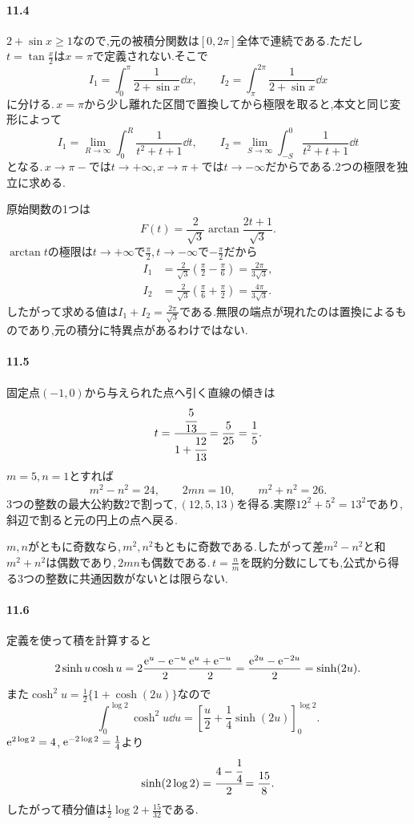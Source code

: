 \paragraph{11.4}
$2+\sin x\ge1$なので,元の被積分関数は$[0,2\pi]$全体で連続である.ただし$t=\tan\frac x2$は$x=\pi$で定義されない.そこで
\[
I_1=\int_0^\pi\frac1{2+\sin x}\dd x,\qquad
I_2=\int_\pi^{2\pi}\frac1{2+\sin x}\dd x
\]
に分ける.\,$x=\pi$から少し離れた区間で置換してから極限を取ると,本文と同じ変形によって
\[
I_1=\lim_{R\to\infty}\int_0^R\frac1{t^2+t+1}\dd t,\qquad
I_2=\lim_{S\to\infty}\int_{-S}^0\frac1{t^2+t+1}\dd t
\]
となる.\,$x\to\pi-$では$t\to+\infty$,\,$x\to\pi+$では$t\to-\infty$だからである.2つの極限を独立に求める.

原始関数の1つは
\[
F(t)=\frac2{\sqrt3}\arctan\frac{2t+1}{\sqrt3}.
\]
$\arctan t$の極限は$t\to+\infty$で$\frac\pi2$,\,$t\to-\infty$で$-\frac\pi2$だから
\[
\begin{aligned}
I_1&=\frac2{\sqrt3}\left(\frac\pi2-\frac\pi6\right)
=\frac{2\pi}{3\sqrt3},\\
I_2&=\frac2{\sqrt3}\left(\frac\pi6+\frac\pi2\right)
=\frac{4\pi}{3\sqrt3}.
\end{aligned}
\]
したがって求める値は$I_1+I_2=\frac{2\pi}{\sqrt3}$である.無限の端点が現れたのは置換によるものであり,元の積分に特異点があるわけではない.

\paragraph{11.5}
固定点$(-1,0)$から与えられた点へ引く直線の傾きは
\[
t=\cfrac{\cfrac5{13}}{1+\cfrac{12}{13}}
=\frac5{25}=\frac15.
\]
$m=5,n=1$とすれば
\[
m^2-n^2=24,\qquad2mn=10,\qquad m^2+n^2=26.
\]
3つの整数の最大公約数$2$で割って,\,$(12,5,13)$を得る.実際$12^2+5^2=13^2$であり,斜辺で割ると元の円上の点へ戻る.

$m,n$がともに奇数なら,\,$m^2,n^2$もともに奇数である.したがって差$m^2-n^2$と和$m^2+n^2$は偶数であり,\,$2mn$も偶数である.\,$t=\frac nm$を既約分数にしても,公式から得る3つの整数に共通因数がないとは限らない.

\paragraph{11.6}
定義を使って積を計算すると
\[
2\sinh u\cosh u
=2\frac{\mathrm{e}^u-\mathrm{e}^{-u}}2\frac{\mathrm{e}^u+\mathrm{e}^{-u}}2
=\frac{\mathrm{e}^{2u}-\mathrm{e}^{-2u}}2
=\sinh(2u).
\]
また$\cosh^2u=\frac12\{1+\cosh(2u)\}$なので
\[
\int_0^{\log2}\cosh^2u\dd u
=\left[\frac u2+\frac14\sinh(2u)\right]_0^{\log2}.
\]
$\mathrm{e}^{2\log2}=4$,\,$\mathrm{e}^{-2\log2}=\frac14$より
\[
\sinh(2\log2)=\cfrac{4-\cfrac14}{2}=\frac{15}{8}.
\]
したがって積分値は$\frac12\log2+\frac{15}{32}$である.

